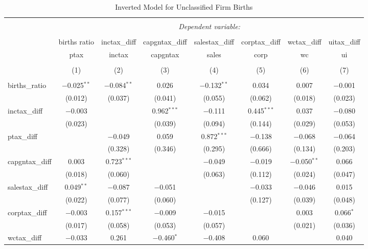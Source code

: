 
\begin{table}[!htbp] \centering 
  \caption{Inverted Model for  Unclassified Firm Births} 
  \label{99rd} 
\footnotesize 
\begin{tabular}{@{\extracolsep{5pt}}lccccccc} 
\\[-1.8ex]\hline 
\hline \\[-1.8ex] 
 & \multicolumn{7}{c}{\textit{Dependent variable:}} \\ 
\cline{2-8} 
\\[-1.8ex] & births ratio & inctax\_diff & capgntax\_diff & salestax\_diff & corptax\_diff & wctax\_diff & uitax\_diff \\ 
 & ptax & inctax & capgntax & sales & corp & wc & ui \\ 
\\[-1.8ex] & (1) & (2) & (3) & (4) & (5) & (6) & (7)\\ 
\hline \\[-1.8ex] 
 births\_ratio & $-$0.025$^{**}$ & $-$0.084$^{**}$ & 0.026 & $-$0.132$^{**}$ & 0.034 & 0.007 & $-$0.001 \\ 
  & (0.012) & (0.037) & (0.041) & (0.055) & (0.062) & (0.018) & (0.023) \\ 
  inctax\_diff & $-$0.003 &  & 0.962$^{***}$ & $-$0.111 & 0.445$^{***}$ & 0.037 & $-$0.080 \\ 
  & (0.023) &  & (0.039) & (0.094) & (0.144) & (0.029) & (0.053) \\ 
  ptax\_diff &  & $-$0.049 & 0.059 & 0.872$^{***}$ & $-$0.138 & $-$0.068 & $-$0.064 \\ 
  &  & (0.328) & (0.346) & (0.295) & (0.666) & (0.134) & (0.203) \\ 
  capgntax\_diff & 0.003 & 0.723$^{***}$ &  & $-$0.049 & $-$0.019 & $-$0.050$^{**}$ & 0.066 \\ 
  & (0.018) & (0.060) &  & (0.063) & (0.112) & (0.024) & (0.047) \\ 
  salestax\_diff & 0.049$^{**}$ & $-$0.087 & $-$0.051 &  & $-$0.033 & $-$0.046 & 0.015 \\ 
  & (0.022) & (0.077) & (0.060) &  & (0.127) & (0.039) & (0.048) \\ 
  corptax\_diff & $-$0.003 & 0.157$^{***}$ & $-$0.009 & $-$0.015 &  & 0.003 & 0.066$^{*}$ \\ 
  & (0.017) & (0.058) & (0.053) & (0.057) &  & (0.021) & (0.036) \\ 
  wctax\_diff & $-$0.033 & 0.261 & $-$0.460$^{*}$ & $-$0.408 & 0.060 &  & 0.040 \\ 

\end{tabular}
\end{table}
